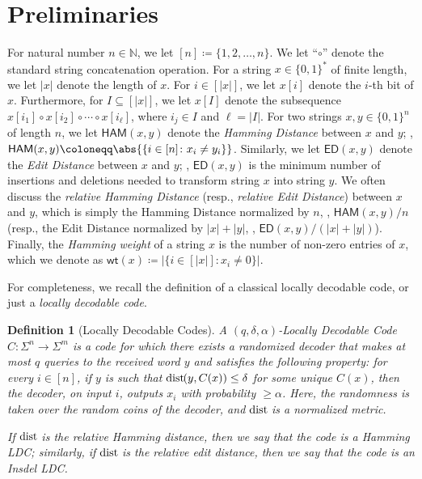 \documentclass[10pt,a4paper]{article}
\newtheorem{definition}{Definition}
\theoremstyle{remark}
\newcommand{\ie}{\text{i.e.}\xspace}
\newcommand{\zo}{\ensuremath{{\{0,1\}}}\xspace}
\newcommand{\ED}{\ensuremath{\mathsf{ED}}\xspace}%
\newcommand{\NAT}{\ensuremath{\mathbb{N}}}
\newcommand{\dist}{\mathrm{dist}\hspace{-1pt}}
\newcommand{\HAM}{\ensuremath{\mathsf{HAM}}}
\begin{document}
\section{Preliminaries}\label{sec:prelims}
For natural number $n \in \NAT$, we let $[n] \coloneqq \{1,2,\dotsc, n\}$.
We let ``$\circ$'' denote the standard string concatenation operation.
For a string $x \in \zo^*$ of finite length, we let $|x|$ denote the length of $x$.
For $i \in [|x|]$, we let $x[i]$ denote the $i$-th bit of $x$. 
Furthermore, for $I \subseteq [|x|]$, we let $x[I]$ denote the subsequence $x[i_1] \circ x[i_2] \circ \cdots \circ x[i_\ell]$, where $i_j \in I$ and $\ell = |I|$.
For two strings $x, y \in \zo^n$ of length $n$, we let $\HAM(x,y)$ denote the \emph{Hamming Distance} between $x$ and $y$; \ie, $\HAM(x,y) \coloneqq \abs{\{ i \in [n] \colon x_i \neq y_i \}}$.
Similarly, we let $\ED(x,y)$ denote the \emph{Edit Distance} between $x$ and $y$; \ie, $\ED(x,y)$ is the minimum number of insertions and deletions needed to transform string $x$ into string $y$.
We often discuss the \emph{relative Hamming Distance} (resp., \emph{relative Edit Distance}) between $x$ and $y$, which is simply the Hamming Distance normalized by $n$, \ie, $\HAM(x,y)/n$ (resp., the Edit Distance normalized by $|x| + |y|$, \ie, $\ED(x,y)/(|x|+|y|)$).
Finally, the \emph{Hamming weight} of a string $x$ is the number of non-zero entries of $x$, which we denote as $\mathsf{wt}(x) \coloneqq |\{i \in [|x|] \colon x_i \neq 0\}|$. 


For completeness, we recall the definition of a classical locally decodable code, or just a \emph{locally decodable code}.
\begin{definition}[Locally Decodable Codes]\label{def:LDC}
    A $(q, \delta, \alpha)$-Locally Decodable Code $C \colon \Sigma^n \rightarrow \Sigma^m$ is a code for which there exists a randomized decoder that makes at most $q$ queries to the received word $y$ and satisfies the following property: for every $i \in [n]$, if $y$ is such that $\dist(y, C(x)) \leq \delta$ for some unique $C(x)$, then the decoder, on input $i$, outputs $x_i$ with probability $\geq \alpha$.
    Here, the randomness is taken over the random coins of the decoder, and $\dist$ is a normalized metric.
    
    If $\dist$ is the relative Hamming distance, then we say that the code is a Hamming LDC; similarly, if $\dist$ is the relative edit distance, then we say that the code is an Insdel LDC.
\end{definition}
\end{document}
